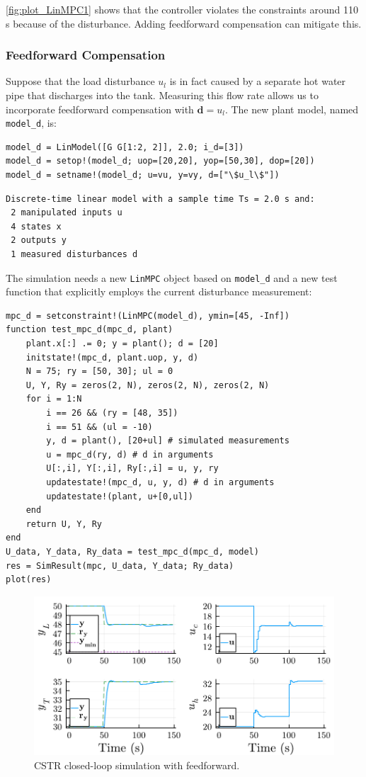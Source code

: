 \cref{fig:plot_LinMPC1} shows that the controller violates the constraints around 110 s because of the disturbance. Adding feedforward compensation can mitigate this.

\subsubsection{Feedforward Compensation}

Suppose that the load disturbance $u_l$ is in fact caused by a separate hot water pipe that discharges into the tank. Measuring this flow rate allows us to incorporate feedforward compensation with $\mathbf{d}=u_l$. The new plant model, named \texttt{model\_d}, is:
\begin{verbatim}
model_d = LinModel([G G[1:2, 2]], 2.0; i_d=[3])
model_d = setop!(model_d; uop=[20,20], yop=[50,30], dop=[20])
model_d = setname!(model_d; u=vu, y=vy, d=["\$u_l\$"])
\end{verbatim}
\spacerepl
\begin{verbatim}
Discrete-time linear model with a sample time Ts = 2.0 s and:
 2 manipulated inputs u
 4 states x
 2 outputs y
 1 measured disturbances d
\end{verbatim}
The simulation needs a new \texttt{LinMPC} object based on \texttt{model\_d} and a new test function that explicitly employs the current disturbance measurement:
\begin{verbatim}
mpc_d = setconstraint!(LinMPC(model_d), ymin=[45, -Inf])
function test_mpc_d(mpc_d, plant)
    plant.x[:] .= 0; y = plant(); d = [20]
    initstate!(mpc_d, plant.uop, y, d)
    N = 75; ry = [50, 30]; ul = 0
    U, Y, Ry = zeros(2, N), zeros(2, N), zeros(2, N)
    for i = 1:N
        i == 26 && (ry = [48, 35])
        i == 51 && (ul = -10)
        y, d = plant(), [20+ul] # simulated measurements
        u = mpc_d(ry, d) # d in arguments
        U[:,i], Y[:,i], Ry[:,i] = u, y, ry
        updatestate!(mpc_d, u, y, d) # d in arguments
        updatestate!(plant, u+[0,ul])
    end
    return U, Y, Ry
end
U_data, Y_data, Ry_data = test_mpc_d(mpc_d, model)
res = SimResult(mpc, U_data, Y_data; Ry_data)
plot(res)
\end{verbatim}

\begin{figure}[h]
    \centering
    \includegraphics[width=\columnwidth]{fig/plot_LinMPC2.pdf}
    \caption{CSTR closed-loop simulation with feedforward.}
    \label{fig:plot_LinMPC2}
\end{figure}

